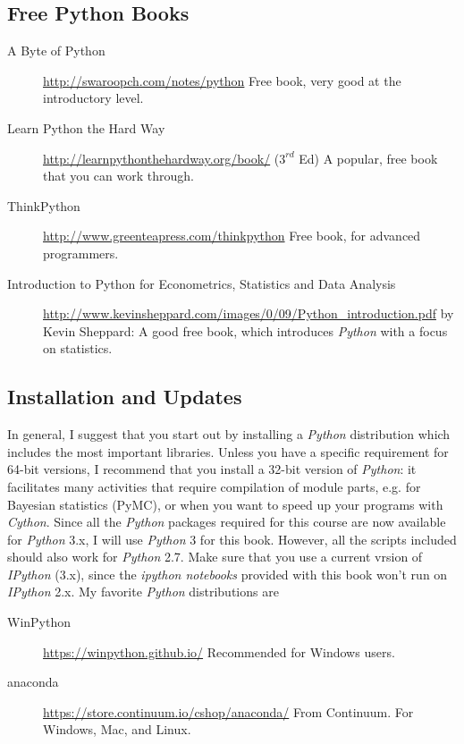 \subsection{Free Python Books}

\begin{description}
  \item[A Byte of Python] \url{http://swaroopch.com/notes/python} Free book, very good at the introductory level.
  \item[Learn Python the Hard Way] \url{http://learnpythonthehardway.org/book/} ($3^{rd}$ Ed) A popular, free book that you can work through.
  \item[ThinkPython] \url{http://www.greenteapress.com/thinkpython} Free book, for advanced programmers.
  \item[Introduction to Python for Econometrics, Statistics and Data Analysis] \url{http://www.kevinsheppard.com/images/0/09/Python_introduction.pdf} by Kevin Sheppard: A
      good free book, which introduces \emph{Python} with a focus on statistics.
\end{description}

\subsection{Installation and Updates}

In general, I suggest that you start out by installing a \emph{Python} distribution which includes the most important libraries. Unless you have a specific requirement for 64-bit versions, I recommend that you install a 32-bit version of \emph{Python}: it facilitates many activities that require compilation of module parts, e.g. for Bayesian statistics (PyMC), or when you want to speed up your programs with \emph{Cython}. Since all the \emph{Python} packages required for this course are now available for \emph{Python} 3.x, I will use \emph{Python} 3 for this book. However, all the scripts included should also work for \emph{Python} 2.7. Make sure that you use a current vrsion of \emph{IPython} (3.x), since the \emph{ipython notebooks} provided with this book won't run on \emph{IPython} 2.x. My favorite \emph{Python} distributions  are

\begin{description}
    \item[WinPython] \url{https://winpython.github.io/} Recommended for Windows users.
    \item[anaconda] \url{https://store.continuum.io/cshop/anaconda/} From Continuum. For Windows, Mac, and Linux.
\end{description}

